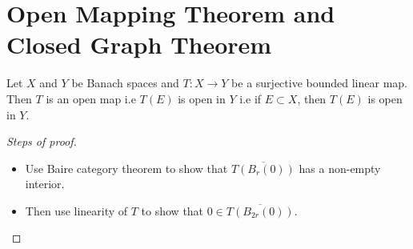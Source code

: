 \section{Open Mapping Theorem and Closed Graph Theorem}
\begin{theorem}
  Let $X$ and $Y$ be Banach spaces and $T: X \to Y$ be a surjective
  bounded linear map. Then $T$ is an open map i.e $T(E)$ is open in
  $Y$ i.e if $E \subset X$, then $T(E)$ is open in $Y$.
\end{theorem}
\begin{proof}[Steps of proof]
  \begin{itemize}
      See Prof. Blecher's Notes on Functional Analysis
    \item Use Baire category theorem to show that
      $\overline{T(B_r(0))}$ has a non-empty interior.
    \item Then use linearity of $T$ to show that $0 \in
      \overline{T(B_{2r}(0))}$.
  \end{itemize}
\end{proof}
